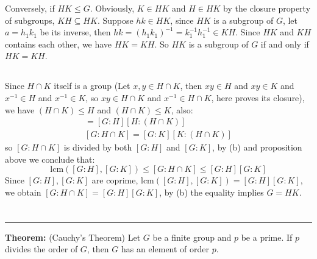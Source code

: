 \documentclass[12pt]{article}
\begin{document}
Conversely, if $HK\le G$. Obviously, $K\in HK$ and $H\in HK$ by the closure property of subgroups, $KH\subseteq HK$. Suppose $hk\in HK$, since $HK$ is a subgroup of $G$, let $a=h_1k_1$ be its inverse, then $hk=(h_1k_1)^{-1}=k_1^{-1}h_1^{-1}\in KH$. Since $HK$ and $KH$ contains each other, we have $HK=KH$. So $HK$ is a subgroup of $G$ if and only if $HK=KH$.
\subsection{}
Since $H\cap K$ itself is a group (Let $x,y\in H\cap K$, then $xy\in H$ and $xy\in K$ and $x^{-1}\in H$ and $x^{-1}\in K$, so $xy\in H\cap K$ and $x^{-1}\in H\cap K$, here proves its closure), we have $(H\cap K)\le H$ and $(H\cap K)\le K$, also:
\begin{align*}
    [G:H\cap K]=[G:H][H:(H\cap K)] \\
    [G:H\cap K]=[G:K][K:(H\cap K)]
\end{align*}
so $[G:H\cap K]$ is divided by both $[G:H]$ and $[G:K]$, by (b) and proposition above we conclude that:
$$\mathrm{lcm}([G:H],[G:K])\le [G:H\cap K]\le [G:H][G:K]$$
Since $[G:H],[G:K]$ are coprime, $\mathrm{lcm}([G:H],[G:K])=[G:H][G:K]$, we obtain $[G:H\cap K]=[G:H][G:K]$, by (b) the equality implies $G=HK$.

\section{}
\noindent\rule{\textwidth}{1pt}

\noindent\textbf{Theorem: }(Cauchy's Theorem) Let $G$ be a finite group and $p$ be a prime. If $p$ divides the order of $G$, then $G$ has an element of order $p$.
\end{document}
